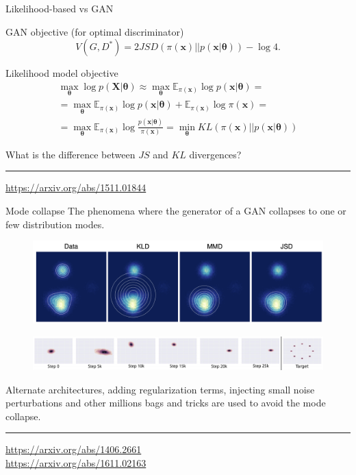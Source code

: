 \documentclass{beamer}
\newcommand{\bx}{\mathbf{x}}
\newcommand{\bX}{\mathbf{X}}
\newcommand{\bbE}{\mathbb{E}}
\newcommand{\btheta}{\boldsymbol{\theta}}
\begin{document}
\begin{frame}{Likelihood-based vs GAN}
	\begin{block}{GAN objective (for optimal discriminator)}
		\vspace{-0.2cm}
		\[
			V(G, D^*)  = 2JSD(\pi(\bx) || p(\bx | \btheta)) - \log 4.
		\]
	\end{block}
	\begin{block}{Likelihood model objective}
		\vspace{-0.6cm}
		\begin{multline*}
			\max_{\btheta} \log p(\bX | \btheta) \approx \max_{\btheta}\bbE_{\pi(\bx)} \log p(\bx | \btheta) = \\ = \max_{\btheta}\bbE_{\pi(\bx)} \log p(\bx | \btheta) + \bbE_{\pi(\bx)} \log \pi(\bx) = \\ = \max_{\btheta}\bbE_{\pi(\bx)}  \log \frac{p(\bx | \btheta)}{\pi(\bx)}= \min_{\btheta} KL(\pi(\bx) || p(\bx | \btheta))
		\end{multline*}
	\vspace{-0.6cm}
	\end{block}

	What is the difference between $JS$ and $KL$ divergences?
\vfill
\hrule\medskip
{\scriptsize \href{https://arxiv.org/abs/1511.01844}{https://arxiv.org/abs/1511.01844}}
\end{frame}
\begin{frame}{Mode collapse}
The phenomena where the generator of a GAN collapses to one or few distribution modes.
\begin{figure}
	\centering
	\includegraphics[width=0.9\linewidth]{figs/mode_collapse_1}
\end{figure}
\begin{figure}
	\centering
	\includegraphics[width=1.0\linewidth]{figs/mode_collapse_3}
\end{figure}
Alternate architectures, adding regularization terms, injecting small noise
perturbations and other millions bags and tricks are used to avoid the mode collapse.
\vfill
\hrule\medskip
{\scriptsize \href{https://arxiv.org/abs/1406.2661}{https://arxiv.org/abs/1406.2661} \\ \href{https://arxiv.org/abs/1611.02163}{https://arxiv.org/abs/1611.02163}}
\end{frame}
\end{document}
